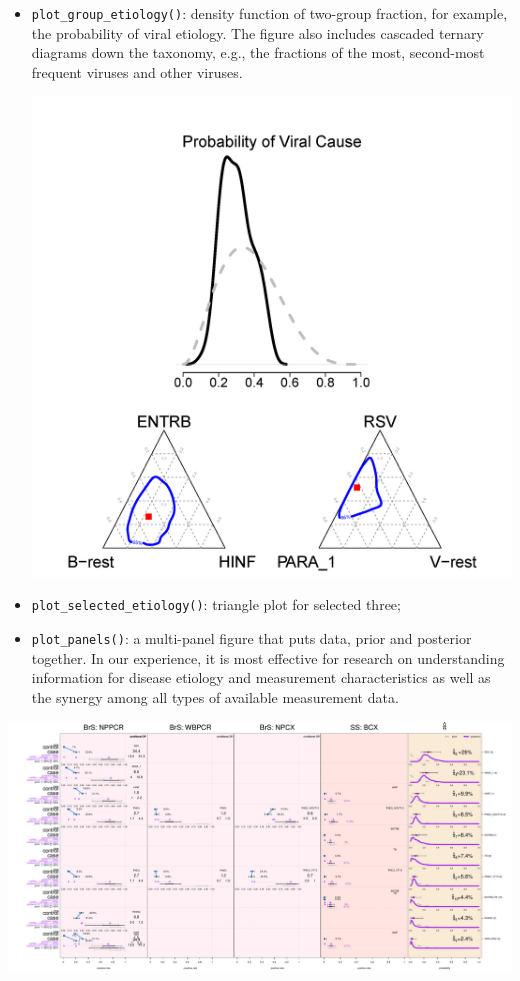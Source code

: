 \documentclass[article]{jss}
\begin{document}
\begin{itemize}
\item
  \texttt{plot\_group\_etiology()}: density function of two-group
  fraction, for example, the probability of viral etiology. The figure
  also includes cascaded ternary diagrams down the taxonomy, e.g., the
  fractions of the most, second-most frequent viruses and other viruses.

  \includegraphics{./figures/grouped_etiology.png}
\item
  \texttt{plot\_selected\_etiology()}: triangle plot for selected three;
\item
  \texttt{plot\_panels()}: a multi-panel figure that puts data, prior
  and posterior together. In our experience, it is most effective for
  research on understanding information for disease etiology and
  measurement characteristics as well as the synergy among all types of
  available measurement data.
\end{itemize}

\begin{CodeChunk}


\begin{center}\includegraphics{figures/unnamed-chunk-3-1} \end{center}

\end{CodeChunk}
\end{document}
